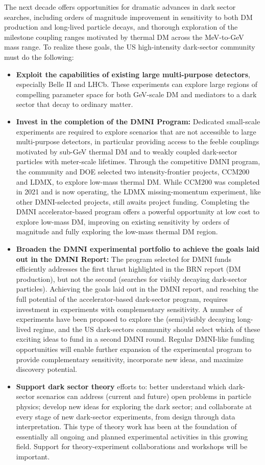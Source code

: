 \documentclass[nofootinbib]{article}
\begin{document}
The next decade offers opportunities for dramatic advances in dark sector searches, including orders of magnitude improvement in sensitivity to both DM production and long-lived particle decays, and thorough exploration of the milestone coupling ranges motivated by thermal DM across the MeV-to-GeV mass range. 
To realize these goals, the US high-intensity dark-sector community must do the following:
\begin{itemize}[leftmargin=1.0em]
\item \textbf{Exploit the capabilities of existing large multi-purpose detectors}, especially Belle II and LHCb.  These experiments can explore large regions of compelling parameter space for both GeV-scale DM and mediators to a dark sector that decay to ordinary matter.  
\item \textbf{Invest in the completion of the DMNI Program:} 
Dedicated small-scale experiments are required to explore scenarios that are not accessible to large multi-purpose detectors, in particular providing access to the feeble couplings motivated by sub-GeV thermal DM and to weakly coupled dark-sector particles with meter-scale lifetimes. 
Through the competitive DMNI program, the community and DOE selected two intensity-frontier projects, CCM200 and LDMX, to explore low-mass thermal DM. While CCM200 was completed in 2021 and is now operating, the LDMX missing-momentum experiment, like other DMNI-selected projects, still awaits project funding.  Completing the DMNI accelerator-based program offers a powerful opportunity at low cost to explore low-mass DM, improving on existing sensitivity by orders of magnitude and fully exploring the low-mass thermal DM region.
\item \textbf{Broaden the DMNI experimental portfolio to achieve the goals laid out in the DMNI Report:} The program selected for DMNI funds efficiently addresses the first thrust highlighted in the BRN report (DM production), but not the second (searches for visibly decaying dark-sector particles). Achieving the goals laid out in the DMNI report, and reaching the full potential of the accelerator-based dark-sector program, requires investment in experiments with complementary sensitivity.  A number of experiments have been proposed to explore the (semi)visibly decaying long-lived regime, and the US dark-sectors community should select which of these exciting ideas to fund in a second DMNI round. Regular DMNI-like funding opportunities will enable further expansion of the experimental program to provide complementary sensitivity, incorporate new ideas, and maximize discovery potential.
\item \textbf{Support dark sector theory} efforts to: better understand which dark-sector scenarios can address (current and future) open problems in particle physics; develop new ideas for exploring the dark sector;
and collaborate at every stage of new dark-sector experiments, from design through data interpretation. This type of theory work has been at the foundation of essentially all ongoing and planned 
experimental activities in this growing field. Support for theory-experiment collaborations and workshops will be important.
\end{itemize}
\end{document}
